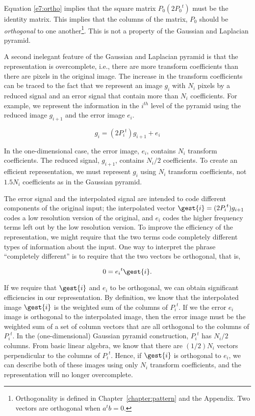 Equation \ref{e7:ortho} implies that the square matrix ${P_0}( 2
{P_0}^t)$ must be the identity matrix.  This implies that the columns of
the matrix, $P_0$ should be {\em orthogonal} to one
another\footnote{Orthogonality is defined in
Chapter~\ref{chapter:pattern} and the Appendix. Two vectors are
orthogonal when $a^t b = 0$.}.  This is not a property of the Gaussian
and Laplacian pyramid.

A second inelegant feature of the Gaussian and Laplacian pyramid is that the
representation is overcomplete, i.e., there are more transform
coefficients than there are pixels in the original image.  The
increase in the transform coefficients can be traced to the fact that
we represent an image $g_i$ with $N_i$ pixels by a reduced signal and
an error signal that contain more than $N_i$ coefficients.  For
example, we represent the information in
the $i^{th}$ level of the pyramid using the reduced image $g_{i+1}$ and
the error image $e_i$.

\begin{equation}
g_i = (2 {P_i}^t) g_{i+1} + e_i
\end{equation}

In the one-dimensional case, the error image, $e_i$, contains $N_{i}$
transform coefficients.  The reduced signal, $g_{i+1}$, contains
${N_i} / 2 $ coefficients.  To create an efficient representation, we
must represent $g_i$ using $N_i$ transform coefficients, not $1.5 N_i$
coefficients as in the Gaussian pyramid.

The error signal and the interpolated signal are intended to code
different components of the original input; the interpolated vector
$\gest{i} = (2 {P_i}^t) g_{i+1}$ codes a low resolution version of the
original, and $e_i$ codes the higher frequency terms left out by the
low resolution version.  To improve the efficiency of the
representation, we might require that the two terms code completely
different types of information about the input.  One way to interpret
the phrase ``completely different'' is to require that the two vectors
be orthogonal, that is,

\begin{equation}
\label{e7:split}
0 = {e_i}^t \gest{i} .
\end{equation}

If we require that $\gest{i}$ and $e_i$ to be orthogonal, we can
obtain significant efficiencies in our representation.  By definition,
we know that the interpolated image $\gest{i}$ is the weighted sum
of the columns of ${P_i}^t$.  If we the error $e_i$ image is
orthogonal to the interpolated image, then the error image must be the
weighted sum of a set of column vectors that are all orthogonal to the
columns of ${P_i}^t$.  In the (one-dimensional) Gaussian pyramid
construction, ${P_i}^t$ has $N_i / 2$ columns.  From basic linear
algebra, we know that there are $ (1 / 2) N_i$ vectors perpendicular
to the columns of ${P_i}^t$.  Hence, if $\gest{i}$ is orthogonal to
$e_i$, we can describe both of these images using only $N_i$ transform
coefficients, and the representation will no longer overcomplete.


